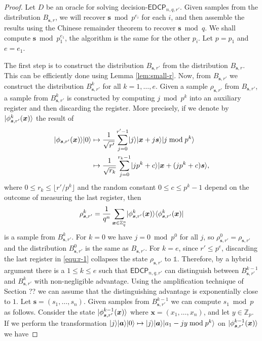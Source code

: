 \documentclass[11pt]{article}
\theoremstyle{plain}
\theoremstyle{definition}
\DeclarePairedDelimiter{\ldbrac}{\lvert}{\rangle}
\DeclarePairedDelimiter{\rdbrac}{\langle}{\rvert}
\def\Z{\ensuremath{\mathbb{Z}}}
\def\edcp{\ensuremath{\mathsf{EDCP}}}
\begin{document}
\begin{proof}
    Let $D$ be an oracle for solving decision-$\edcp_{n, q, r'}$. Given samples from the distribution $B_{\bm{s}, r}$, we will recover $\bm{s} \bmod p^{e_i}$ for each $i$, and then assemble the results using the Chinese remainder theorem to recover $\bm{s} \bmod q$. We shall compute $\bm{s} \bmod p_1^{e_1}$, the algorithm is the same for the other $p_i$. Let $p = p_1$ and $e = e_1$.

    The first step is to construct the distribution $B_{\bm{s}, r'}$ from the distribution $B_{\bm{s}, r}$. This can be efficiently done using Lemma \ref{lem:small-r}. Now, from $B_{\bm{s}, r'}$ we construct the distribution $B_{\bm{s}, r'}^k$ for all $k = 1, \dots, e$. Given a sample $\rho_{\bm{s}, r'}$ from $B_{\bm{s}, r'}$, a sample from $B_{\bm{s}, r'}^k$ is constructed by computing $j \bmod p^k$ into an auxiliary register and then discarding the register. More precisely, if we denote by  $\ldbrac{\phi_{\bm{s}, r'}^k(\bm{x})}$ the result of 
    \begin{align}
        \ldbrac{\phi_{\bm{s}, r'}(\bm{x})}\ldbrac{0}
        & \mapsto \frac{1}{\sqrt{r'}} \sum_{j = 0}^{r' - 1} \ldbrac{j}\ldbrac{\bm{x} + j\bm{s}}\ldbrac{j \bmod p^k} \label{equ:r-1}  \\
        & \mapsto \frac{1}{\sqrt{r_k}} \sum_{j = 0}^{r_k - 1} \ldbrac{jp^k + c}\ldbrac{\bm{x} + (jp^k + c)\bm{s}}, \nonumber
    \end{align}
    where $0 \le r_k \le \lfloor r' / p^k \rfloor$ and the random constant $0 \le c \le p^k - 1$ depend on the outcome of measuring the last register, then
    \[ \rho_{\bm{s}, r'}^k = \frac{1}{q^n} \sum_{\bm{x} \in \Z_q^n} \ldbrac{\phi_{\bm{s}, r'}^k(\bm{x})} \rdbrac{\phi_{\bm{s}, r'}^k(\bm{x})} \]
    is a sample from $B_{\bm{s}, r'}^k$. For $k = 0$ we have $j = 0 \bmod p^0$ for all $j$, so $\rho_{\bm{s}, r'}^0 = \rho_{\bm{s}, r'}$ and the distribution $B_{\bm{s}, r'}^0$ is the same as $B_{\bm{s}, r'}$. For $k = e$, since $r' \le p^e$, discarding the last register in \eqref{equ:r-1} collapses the state $\rho_{\bm{s}, r'}$ to $\mathds{1}$. Therefore, by a hybrid argument there is a $1 \le k \le e$ such that $\edcp_{n, q, r'}$ can distinguish between $B_{\bm{s}, r'}^{k - 1}$ and $B_{\bm{s}, r'}^k$ with non-negligible advantage. Using the amplification technique of Section ?? we can assume that the distinguishing advantage is exponentially close to $1$. Let $\bm{s} = (s_1, \dots, s_n)$. Given samples from $B_{\bm{s}, r'}^{k - 1}$ we can compute $s_1 \bmod p$ as follows. Consider the state $\ldbrac{\phi_{\bm{s}, r'}^{k - 1}(\bm{x})}$ where $\bm{x} = (x_1, \dots, x_n)$, and let $y \in \Z_p$. If we perform the transformation $\ldbrac{j}\ldbrac{\bm{a}}\ldbrac{0} \mapsto \ldbrac{j}\ldbrac{\bm{a}}\ldbrac{a_1 - jy \bmod p^k}$ on $\ldbrac{\phi_{\bm{s}, r'}^{k - 1}(\bm{x})}$ we have

\end{proof}
\end{document}
